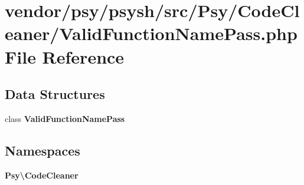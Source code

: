 \section{vendor/psy/psysh/src/\+Psy/\+Code\+Cleaner/\+Valid\+Function\+Name\+Pass.php File Reference}
\label{_valid_function_name_pass_8php}
\subsection*{Data Structures}
\begin{DoxyCompactItemize}
\item 
class {\bf Valid\+Function\+Name\+Pass}
\end{DoxyCompactItemize}
\subsection*{Namespaces}
\begin{DoxyCompactItemize}
\item 
 {\bf Psy\textbackslash{}\+Code\+Cleaner}
\end{DoxyCompactItemize}
